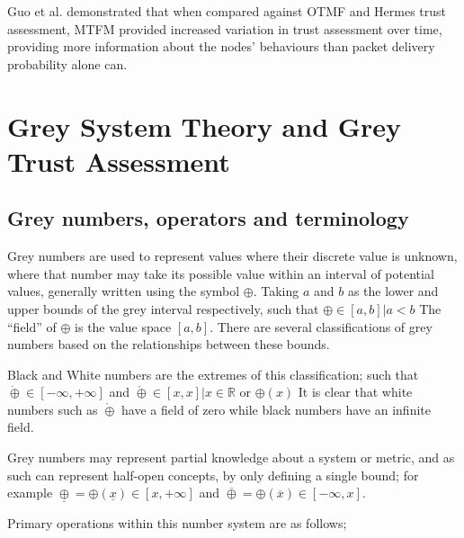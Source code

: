 Guo et al. demonstrated that when compared against OTMF and Hermes trust assessment, MTFM provided increased variation in trust assessment over time, providing more information about the nodes' behaviours than packet delivery probability alone can.

\section{Grey System Theory and Grey Trust Assessment}

\subsection{Grey numbers, operators and terminology}

Grey numbers are used to represent values where their discrete value is unknown, where that number may take its possible value within an interval of potential values, generally written using the symbol $\oplus$.
Taking $a$ and $b$ as the lower and upper bounds of the grey interval respectively, such that $\oplus \in [a,b] | a < b$ 
The ``field'' of $\oplus$ is the value space $[a,b]$.
There are several classifications of grey numbers based on the relationships between these bounds.

Black and White numbers are the extremes of this classification; such that $\dot\oplus \in [-\infty, +\infty]$ and $\mathring\oplus \in [x, x] | x \in \mathbb{R}$ or $\oplus(x)$
It is clear that white numbers such as $\mathring\oplus$ have a field of zero while black numbers have an infinite field.

Grey numbers may represent partial knowledge about a system or metric, and as such can represent half-open concepts, by only defining a single bound; for example $\underline\oplus = \oplus(\underline x ) \in [x, +\infty]$ and $\overline\oplus = \oplus(\overline x) \in [-\infty, x]$.

Primary operations within this number system are as follows;

